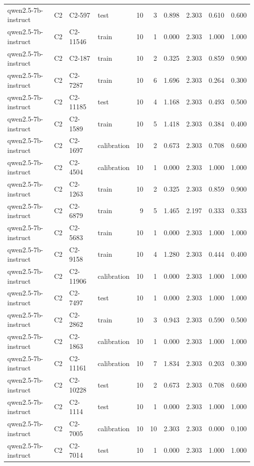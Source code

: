 \begin{table}
\begin{tabular}{llllrrrrrr}
qwen2.5-7b-instruct & C2 & C2-597 & test & 10 & 3 & 0.898 & 2.303 & 0.610 & 0.600 \\
qwen2.5-7b-instruct & C2 & C2-11546 & train & 10 & 1 & 0.000 & 2.303 & 1.000 & 1.000 \\
qwen2.5-7b-instruct & C2 & C2-187 & train & 10 & 2 & 0.325 & 2.303 & 0.859 & 0.900 \\
qwen2.5-7b-instruct & C2 & C2-7287 & train & 10 & 6 & 1.696 & 2.303 & 0.264 & 0.300 \\
qwen2.5-7b-instruct & C2 & C2-11185 & test & 10 & 4 & 1.168 & 2.303 & 0.493 & 0.500 \\
qwen2.5-7b-instruct & C2 & C2-1589 & train & 10 & 5 & 1.418 & 2.303 & 0.384 & 0.400 \\
qwen2.5-7b-instruct & C2 & C2-1697 & calibration & 10 & 2 & 0.673 & 2.303 & 0.708 & 0.600 \\
qwen2.5-7b-instruct & C2 & C2-4504 & calibration & 10 & 1 & 0.000 & 2.303 & 1.000 & 1.000 \\
qwen2.5-7b-instruct & C2 & C2-1263 & train & 10 & 2 & 0.325 & 2.303 & 0.859 & 0.900 \\
qwen2.5-7b-instruct & C2 & C2-6879 & train & 9 & 5 & 1.465 & 2.197 & 0.333 & 0.333 \\
qwen2.5-7b-instruct & C2 & C2-5683 & train & 10 & 1 & 0.000 & 2.303 & 1.000 & 1.000 \\
qwen2.5-7b-instruct & C2 & C2-9158 & train & 10 & 4 & 1.280 & 2.303 & 0.444 & 0.400 \\
qwen2.5-7b-instruct & C2 & C2-11906 & calibration & 10 & 1 & 0.000 & 2.303 & 1.000 & 1.000 \\
qwen2.5-7b-instruct & C2 & C2-7497 & test & 10 & 1 & 0.000 & 2.303 & 1.000 & 1.000 \\
qwen2.5-7b-instruct & C2 & C2-2862 & train & 10 & 3 & 0.943 & 2.303 & 0.590 & 0.500 \\
qwen2.5-7b-instruct & C2 & C2-1863 & calibration & 10 & 1 & 0.000 & 2.303 & 1.000 & 1.000 \\
qwen2.5-7b-instruct & C2 & C2-11161 & calibration & 10 & 7 & 1.834 & 2.303 & 0.203 & 0.300 \\
qwen2.5-7b-instruct & C2 & C2-10228 & test & 10 & 2 & 0.673 & 2.303 & 0.708 & 0.600 \\
qwen2.5-7b-instruct & C2 & C2-1114 & test & 10 & 1 & 0.000 & 2.303 & 1.000 & 1.000 \\
qwen2.5-7b-instruct & C2 & C2-7005 & calibration & 10 & 10 & 2.303 & 2.303 & 0.000 & 0.100 \\
qwen2.5-7b-instruct & C2 & C2-7014 & test & 10 & 1 & 0.000 & 2.303 & 1.000 & 1.000 \\

\end{tabular}
\end{table}
